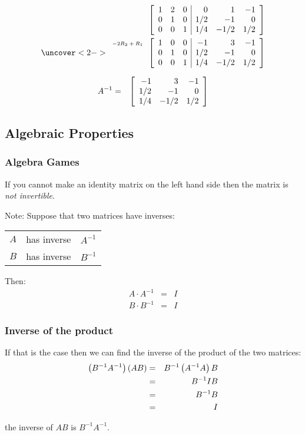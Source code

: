 \begin{frame}
  \begin{eqnarray*}
      \stateThree{~}{~}{~}
      \startRowOpsThree
      \oneRowOpsThree{1}{2}{0}{0}{1}{-1}
      \oneRowOpsThree{0}{1}{0}{1/2}{-1}{0}
      \oneRowOpsThree{0}{0}{1}{1/4}{-1/2}{1/2}
      \stopRowOps \\
    \uncover<2->
    {
      \stateThree{-2R_2+R_1}{~}{~}
      \startRowOpsThree
      \oneRowOpsThree{1}{0}{0}{-1}{3}{-1}
      \oneRowOpsThree{0}{1}{0}{1/2}{-1}{0}
      \oneRowOpsThree{0}{0}{1}{1/4}{-1/2}{1/2}
      \stopRowOps 
    }
  \end{eqnarray*}

  {
    \begin{eqnarray*}
      A^{-1} & =  & \left[ \begin{array}{rrr} -1 & 3 & -1 \\ 1/2 & -1 & 0 \\ 1/4 & -1/2 & 1/2 \end{array} \right]
    \end{eqnarray*}
  }

\end{frame}

\subsection{Algebraic Properties}

\begin{frame}
  \frametitle{Algebra Games}

  If you cannot make an identity matrix on the left hand side then the
  matrix is \textit{not invertible}.

  Note: Suppose that two matrices have inverses: \\
  \begin{tabular}{lll}
    $A$ & has inverse & $A^{-1}$ \\
    $B$ & has inverse & $B^{-1}$
  \end{tabular}

  Then:
  \begin{eqnarray*}
    A \cdot A^{-1} & = & I \\
    B \cdot B^{-1} & = & I
  \end{eqnarray*}
\end{frame}


\begin{frame}
  \frametitle{Inverse of the product}

  If that is the case then we can find the inverse of the product of
  the two matrices:
  \begin{eqnarray*}
    \left( B^{-1} A^{-1} \right) \left( A B \right) & = & B^{-1} \left( A^{-1} A \right) B \\
    & = & B^{-1} I B \\
    & = & B^{-1} B \\
    & = & I
  \end{eqnarray*}

  the inverse of $AB$ is $B^{-1}A^{-1}$.

\end{frame}


